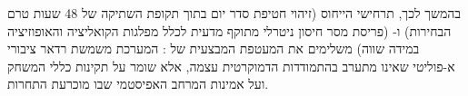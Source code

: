 בהמשך לכך, תרחישי הייחוס  (זיהוי חטיפת סדר יום בתוך תקופת השתיקה של 48 שעות טרם הבחירות) ו- (פריסת מסר חיסון ניטרלי מתוקף מדעית לכלל מפלגות הקואליציה והאופוזיציה במידה שווה) משלימים את המעטפת המבצעית של : המערכת משמשת רדאר ציבורי א-פוליטי שאינו מתערב בהתמודדות הדמוקרטית עצמה, אלא שומר על תקינות כללי המשחק ועל אמינות המרחב האפיסטמי שבו מוכרעת התחרות.
